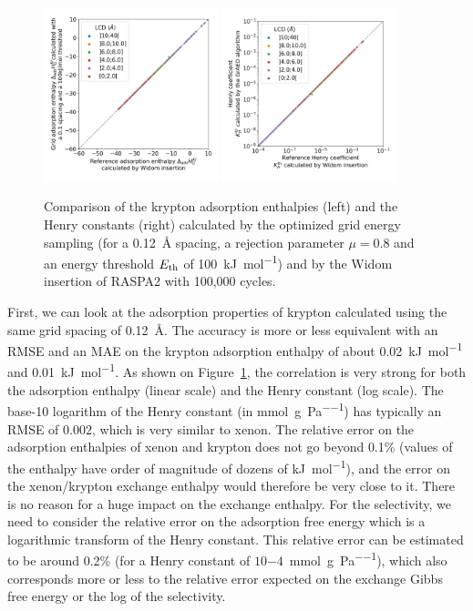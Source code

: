 \documentclass[main]{subfiles}
\begin{document}
\begin{figure}[ht]
  \centering
    \includegraphics[width=0.45\textwidth]{figures/3-fastsim/H_Kr_0_widom_vs_H_Kr_grid_overview.jpg}
    \includegraphics[width=0.45\textwidth]{figures/3-fastsim/K_Kr_widom_vs_K_Kr_grid_overview.jpg}
    \caption{Comparison of the krypton adsorption enthalpies (left) and the Henry constants (right) calculated by the optimized grid energy sampling (for a \SI{0.12}{\angstrom} spacing, a rejection parameter $\mu=0.8$ and an energy threshold $E_{\text{th}}$ of \SI{100}{\kilo\joule\per\mole}) and by the Widom insertion of RASPA2 with 100,000 cycles. }\label{fgr:grid_widom_kr}
\end{figure}

First, we can look at the adsorption properties of krypton calculated using the same grid spacing of \SI{0.12}{\angstrom}. The accuracy is more or less equivalent with an RMSE and an MAE on the krypton adsorption enthalpy of about \SI{0.02}{\kilo\joule\per\mole} and \SI{0.01}{\kilo\joule\per\mole}. As shown on Figure~\ref{fgr:grid_widom_kr}, the correlation is very strong for both the adsorption enthalpy (linear scale) and the Henry constant (log scale). The base-10 logarithm of the Henry constant (in \si{\milli\mole\per\gram\per\pascal}) has typically an RMSE of $0.002$, which is very similar to xenon. The relative error on the adsorption enthalpies of xenon and krypton does not go beyond {0.1\%} (values of the enthalpy have order of magnitude of dozens of \si{\kilo\joule\per\mole}), and the error on the xenon/krypton exchange enthalpy would therefore be very close to it. There is no reason for a huge impact on the exchange enthalpy. For the selectivity, we need to consider the relative error on the adsorption free energy which is a logarithmic transform of the Henry constant. This relative error can be estimated to be around {0.2\%} (for a Henry constant of $10{-4}$~\si{\milli\mole\per\gram\per\pascal}), which also corresponds more or less to the relative error expected on the exchange Gibbs free energy or the log of the selectivity.
\end{document}
